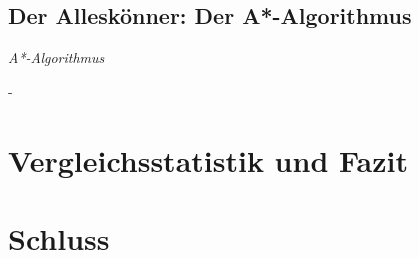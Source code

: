 \documentclass[12pt]{article}
\begin{document}
\subsection{Der Alleskönner: Der A*-Algorithmus}
\label{sec:astar}
\begin{algorithm}
\caption{\textit{A*-Algorithmus} \label{alg:astar}}
\begin{algorithmic}[1]
\Statex
{}
\Statex
\end{algorithmic}
\end{algorithm}
\newpage
-
\newpage

\section{Vergleichsstatistik und Fazit}
\newpage
\section{Schluss}
\newpage
\end{document}
